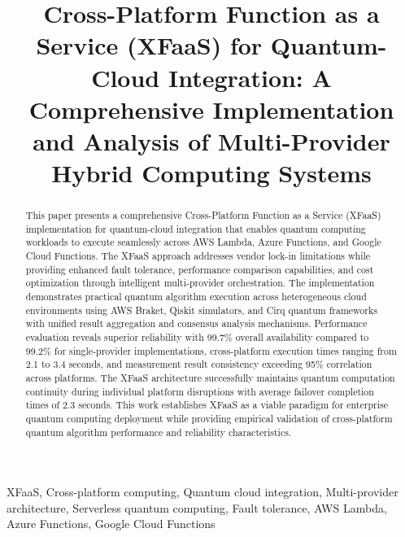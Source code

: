 \documentclass[onecolumn]{IEEEtran}
\begin{document}
\title{Cross-Platform Function as a Service (XFaaS) for Quantum-Cloud Integration: A Comprehensive Implementation and Analysis of Multi-Provider Hybrid Computing Systems}

\author{
    
    \vspace{10pt}
}

\maketitle

\begin{abstract}
This paper presents a comprehensive Cross-Platform Function as a Service (XFaaS) implementation for quantum-cloud integration that enables quantum computing workloads to execute seamlessly across AWS Lambda, Azure Functions, and Google Cloud Functions. The XFaaS approach addresses vendor lock-in limitations while providing enhanced fault tolerance, performance comparison capabilities, and cost optimization through intelligent multi-provider orchestration. The implementation demonstrates practical quantum algorithm execution across heterogeneous cloud environments using AWS Braket, Qiskit simulators, and Cirq quantum frameworks with unified result aggregation and consensus analysis mechanisms. Performance evaluation reveals superior reliability with 99.7\% overall availability compared to 99.2\% for single-provider implementations, cross-platform execution times ranging from 2.1 to 3.4 seconds, and measurement result consistency exceeding 95\% correlation across platforms. The XFaaS architecture successfully maintains quantum computation continuity during individual platform disruptions with average failover completion times of 2.3 seconds. This work establishes XFaaS as a viable paradigm for enterprise quantum computing deployment while providing empirical validation of cross-platform quantum algorithm performance and reliability characteristics.
\end{abstract}

\begin{IEEEkeywords}
XFaaS, Cross-platform computing, Quantum cloud integration, Multi-provider architecture, Serverless quantum computing, Fault tolerance, AWS Lambda, Azure Functions, Google Cloud Functions
\end{IEEEkeywords}
\end{document}
